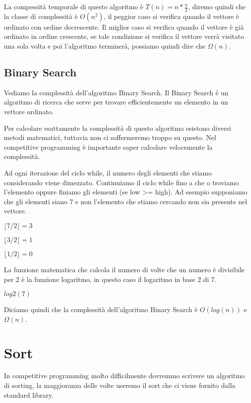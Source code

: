 \documentclass{article}
\newcommand{\floor}[1]{\lfloor #1 \rfloor}
\begin{document}


La compessità temporale di questo algoritmo è $T(n) = n * \frac{n}{2}$, diremo quindi che la classe di complessità è $O(n^2)$, il peggior caso si verifica quando il vettore è ordinato con ordine decrescente. Il miglior caso si verifica quando il vettore è già ordinato in ordine crescente, se tale condizione si verifica il vettore verrà visitato una sola volta e poi l'algoritmo terminerà, possiamo quindi dire che $\Omega(n)$.

\subsection{Binary Search}

Vediamo la complessità dell'algoritmo Binary Search. Il Binary Search è un algoritmo di ricerca che serve per trovare efficientemente un elemento in un vettore ordinato.



Per calcolare esattamente la complessità di questo algoritmo esistono diversi metodi matematici, tuttavia non ci soffermeremo troppo su questo. Nel competitive programming è importante saper calcolare velocemente la complessità.


Ad ogni iterazione del ciclo while, il numero degli elementi che stiamo considerando viene dimezzato. 
Continuiamo il ciclo while fino a che o troviamo l'elemento oppure finiamo gli elementi (se low >= high).
Ad esempio supponiamo che gli elementi siano 7 e non l'elemento che stiamo cercando non sia presente nel vettore.

$ \floor{7/2} = 3 $

$ \floor{3/2} = 1 $

$ \floor{1/2} = 0 $

La funzione matematica che calcola il numero di volte che un numero è divisibile per 2 è la funzione logaritmo, in questo caso il logaritmo in base 2 di 7.

$ log2(7) $

Diciamo quindi che la complessità dell'algoritmo Binary Search è $O(log(n))$ e $\Omega(n)$.

\section{Sort}

In competitive programming molto difficilmente dovremmo scrivere un algoritmo di sorting, la maggioranza delle volte useremo il sort che ci viene fornito dalla standard library.
\end{document}
